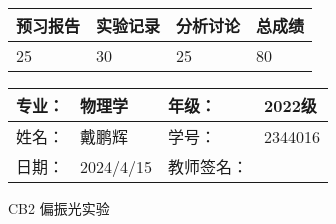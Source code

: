 \documentclass[dvipsnames, svgnames,a4paper,11pt]{article}
\begin{document}
\begin{table}
	\renewcommand\arraystretch{1.7}
	\begin{tabularx}{\textwidth}{
		|X|X|X|X
		|X|X|X|X|}
	\hline
	\multicolumn{2}{|c|}{预习报告}&\multicolumn{2}{|c|}{实验记录}&\multicolumn{2}{|c|}{分析讨论}&\multicolumn{2}{|c|}{总成绩}\\
	\hline
	\LARGE25 & & \LARGE30 & & \LARGE25 & & \LARGE80 & \\
	\hline
	\end{tabularx}
\end{table}


\begin{table}
	\renewcommand\arraystretch{1.7}
	\begin{tabularx}{\textwidth}{|X|X|X|X|}
	\hline
	专业：& 物理学 &年级：& 2022级\\
	\hline
	姓名：& 戴鹏辉  & 学号： & 2344016 \\
	\hline
	日期：& 2024/4/15 & 教师签名：& \\
	\hline
	\end{tabularx}
\end{table}

\begin{center}
	\LARGE CB2 \quad 偏振光实验
\end{center}
\end{document}
